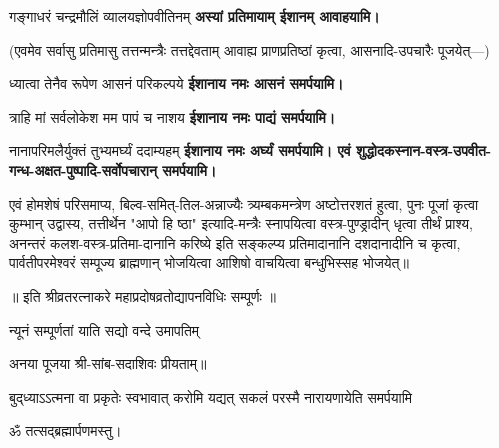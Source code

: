 {गङ्गाधरं चन्द्रमौलिं व्यालयज्ञोपवीतिनम्}
\textbf{अस्यां प्रतिमायाम् ईशानम् आवाहयामि।}

(एवमेव सर्वासु प्रतिमासु तत्तन्मन्त्रैः तत्तद्देवताम् आवाह्य प्राणप्रतिष्ठां कृत्वा,
आसनादि-उपचारैः पूजयेत्—)

{ध्यात्वा तेनैव रूपेण आसनं परिकल्पये}
\textbf{ईशानाय नमः आसनं समर्पयामि।}

{त्राहि मां सर्वलोकेश मम पापं च नाशय}
\textbf{ईशानाय नमः पाद्यं समर्पयामि।}

{नानापरिमलैर्युक्तं तुभ्यमर्घ्यं ददाम्यहम्}
\textbf{ईशानाय नमः अर्घ्यं समर्पयामि। एवं शुद्धोदकस्नान-वस्त्र-उपवीत-गन्ध-अक्षत-पुष्पादि-सर्वोपचारान् समर्पयामि।}

एवं होमशेषं परिसमाप्य, बिल्व-समित्-तिल-अन्नाज्यैः त्र्यम्बकमन्त्रेण अष्टोत्तरशतं हुत्वा,
पुनः पूजां कृत्वा कुम्भान् उद्वास्य, तत्तीर्थेन "आपो हि ष्ठा" इत्यादि-मन्त्रैः स्नापयित्वा
वस्त्र-पुण्ड्रादीन् धृत्वा तीर्थं प्राश्य, अनन्तरं कलश-वस्त्र-प्रतिमा-दानानि करिष्ये इति सङ्कल्प्य
प्रतिमादानानि दशदानादीनि च कृत्वा, पार्वतीपरमेश्वरं सम्पूज्य ब्राह्मणान् भोजयित्वा
आशिषो वाचयित्वा बन्धुभिस्सह भोजयेत्॥

॥ इति श्रीव्रतरत्नाकरे महाप्रदोषव्रतोद्यापनविधिः सम्पूर्णः ॥


    


{न्यूनं सम्पूर्णतां याति सद्यो वन्दे उमापतिम्}

अनया पूजया श्री-सांब-सदाशिवः प्रीयताम्॥

{बुद्‌ध्याऽऽत्मना वा प्रकृतेः स्वभावात्}
{करोमि यद्यत् सकलं परस्मै}
{नारायणायेति समर्पयामि}

\centerline{ॐ तत्सद्ब्रह्मार्पणमस्तु।}

\closesub


\closesection
